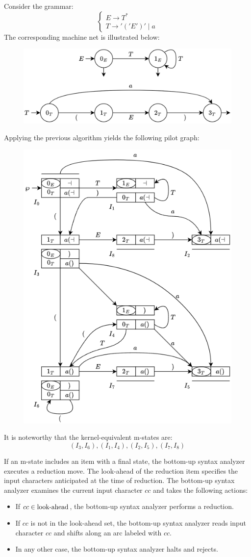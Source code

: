 \begin{example}
    Consider the grammar: 
    \[\begin{cases}
        E \rightarrow T^{\ast} \\
        T \rightarrow '('E')'\mid a
    \end{cases}\]
    The corresponding machine net is illustrated below:
    \begin{figure}[H]
        \centering
        \includegraphics[width=0.5\linewidth]{images/net2.png}
    \end{figure}
    Applying the previous algorithm yields the following pilot graph:
    \begin{figure}[H]
        \centering
        \includegraphics[width=0.4\linewidth]{images/pil.png}
    \end{figure}
    It is noteworthy that the kernel-equivalent m-states are:
    \[(I_3, I_6),(I_1, I_4),(I_2, I_5),(I_7, I_8)\]
\end{example}
If an m-state includes an item with a final state, the bottom-up syntax analyzer executes a reduction move.
The look-ahead of the reduction item specifies the input characters anticipated at the time of reduction.
The bottom-up syntax analyzer examines the current input character $cc$ and takes the following actions:
\begin{itemize}
    \item If $cc \in \textnormal{look-ahead}$, the bottom-up syntax analyzer performs a reduction.
    \item If $cc$ is not in the look-ahead set, the bottom-up syntax analyzer reads input character $cc$ and shifts along an arc labeled with $cc$.
    \item In any other case, the bottom-up syntax analyzer halts and rejects.
\end{itemize}


